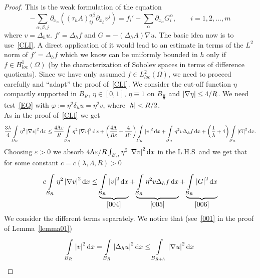 \begin{proof}
	This is the weak formulation of the equation
	\[ - \sum\limits_{\alpha ,\beta ,j}^{} \partial_{x_{\alpha}} \left( {(\tau _{h}A)}_{ij}^{\alpha \beta } \partial_{x_{\beta }} v^{j} \right)= f_{i}' - \sum\limits_{\alpha }^{} \partial_{x_{\alpha }} G_{i}^{\alpha }, \qquad i=1,2,\ldots,m \tag{EQ} \label{EQ} \]
	where \( v= \Delta _{h}u \). \( f'=\Delta _{h}f \) and \( G=-(\Delta _{h}A) \nabla u \). The basic idea now is to use~\eqref{CLI}. A direct application of it would lead to an estimate in terms of the \( L^{2} \) norm of \( f'=\Delta _{h}f \) which we know can be uniformly bounded in \( h \) only if \( f \in H_{loc}^{1}(\Omega )  \) (by the characterization of Sobolev spaces in terms of difference quotients). Since we have only assumed \( f \in L_{loc}^{2}(\Omega) \), we need to proceed carefully and \enquote{adapt} the proof of~\eqref{CLI}. We consider the cut-off function \( \eta \) compactly supported in \( B_{R} \), \( \eta \in [0,1]  \), \( \eta \equiv 1 \) on \( B_{\frac{R}{2}} \) and \( \abs{\nabla \eta }\leq \frac{4}{R} \). We need test~\eqref{EQ} with \( \varphi := \eta ^{2}\delta _{h}u= \eta ^{2}v \), where \( \abs{h}<\frac{R}{2} \). \\
	As in the proof of~\eqref{CLI} we get
	\[ \frac{3 \lambda }{4}\int\limits_{B_{R}}^{} \eta ^{2}\abs{\nabla v}^{2} \dd{x} \leq  \frac{4 \Lambda \varepsilon }{R}\int\limits_{B_{R}}^{} \eta ^{2}\abs{\nabla v}^{2} \dd{x}+ \left( \frac{4 \Lambda }{R \varepsilon }+ \frac{4}{R^{2}}\right) \int\limits_{B_{R}}^{} \abs{v}^{2} \dd{x}	+ \int\limits_{B_{R}}^{} \eta ^{2}v \Delta _{h}f \dd{x} + \left( \frac{1}{\lambda } + 4	 \right) \int\limits_{B_{R}}^{} \abs{G}^{2} \dd{x}. \]
	Choosing \( \varepsilon > 0 \) we absorb \( \frac{4 \Lambda \varepsilon }{R} \int_{B_{R}}^{} \eta ^{2} \abs{\nabla v}^{2} \dd{x} \) in the L.H.S\ and we get that for some constant \( c=c(\lambda , \Lambda , R) > 0 \)
	\begin{gather}
		c \int\limits_{B_{R}}^{} \eta ^{2}\left\lvert\nabla v\right\rvert^{2} \mathop{}\!\mathrm{d}x \leq \underbrace{\int\limits_{B_{R}}^{} \left\lvert v\right\rvert^{2} \mathop{}\!\mathrm{d}x}_{\eqref{004}} + \underbrace{\int\limits_{B_{R}}^{} \eta ^{2} v \Delta _{h}f \mathop{}\!\mathrm{d}x}_{\eqref{005} } + \underbrace{\int\limits_{B_{R}}^{} \left\lvert G\right\rvert^{2} \mathop{}\!\mathrm{d}x}_{\eqref{006}} \label{003}
	\end{gather}
	We consider the different terms separately. We notice that (see~\eqref{001} in the proof of Lemma~\ref{lemma01})
	\begin{gather}
		\int\limits_{B_{R}}^{} \abs{v}^{2} \dd{x} = \int\limits_{B_{R}}^{} \abs{\Delta _{h} u}^{2} \dd{x} \leq \int\limits_{B_{R+h}}^{} \abs{\nabla u}^{2} \dd{x} \label{004}

\end{gather}
\end{proof}
